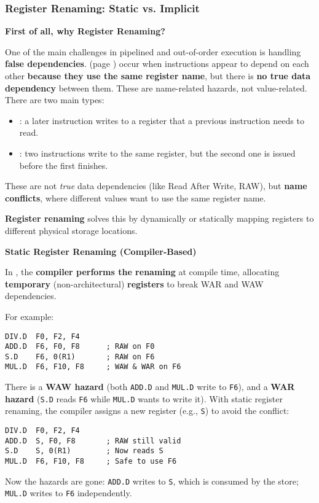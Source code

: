 \subsubsection{Register Renaming: Static vs. Implicit}\label{subsubsection: static vs implicit register renaming}

\begin{flushleft}
    \textcolor{Green3}{ \textbf{First of all, why Register Renaming?}}
\end{flushleft}
One of the main challenges in pipelined and out-of-order execution is handling \textbf{false dependencies}.  (page \pageref{subsubsection: Name Dependencies}) occur when instructions appear to depend on each other \textbf{because they use the same register name}, but there is \textbf{no true data dependency} between them. These are name-related hazards, not value-related. There are two main types:
\begin{itemize}
    \item {}: a later instruction writes to a register that a previous instruction needs to read.
    \item {}: two instructions write to the same register, but the second one is issued before the first finishes.
\end{itemize}
These are not \emph{true} data dependencies (like Read After Write, RAW), but \textbf{name conflicts}, where different values want to use the same register name.

\highspace
\textcolor{Green3}{ \textbf{Register renaming}} solves this by dynamically or statically mapping registers to different physical storage locations.

\highspace
\begin{flushleft}
    \textcolor{Red2}{ \textbf{Static Register Renaming (Compiler-Based)}}
\end{flushleft}
In , the \textbf{compiler performs the renaming} at compile time, allocating \textbf{temporary} (non-architectural) \textbf{registers} to break WAR and WAW dependencies.

\highspace
For example:
\begin{lstlisting}[language=unknown]
DIV.D  F0, F2, F4
ADD.D  F6, F0, F8      ; RAW on F0
S.D    F6, 0(R1)       ; RAW on F6
MUL.D  F6, F10, F8     ; WAW & WAR on F6
\end{lstlisting}
There is a \textbf{WAW hazard} (both \texttt{ADD.D} and \texttt{MUL.D} write to \texttt{F6}), and a \textbf{WAR hazard} (\texttt{S.D} reads \texttt{F6} while \texttt{MUL.D} wants to write it). With static register renaming, the compiler assigns a new register (e.g., \texttt{S}) to avoid the conflict:
\begin{lstlisting}[language=unknown]
DIV.D  F0, F2, F4
ADD.D  S, F0, F8       ; RAW still valid
S.D    S, 0(R1)        ; Now reads S
MUL.D  F6, F10, F8     ; Safe to use F6
\end{lstlisting}
Now the hazards are gone: \texttt{ADD.D} writes to \texttt{S}, which is consumed by the store; \texttt{MUL.D} writes to \texttt{F6} independently.

